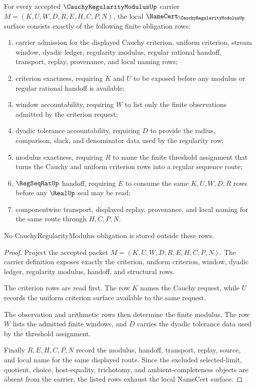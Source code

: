 \begin{theorem}
\label{thm:cauchy-regularity-modulus-namecert-obligations}
For every accepted $\CauchyRegularityModulusUp$ carrier $M=(K,U,W,D,R,E,H,C,P,N)$, the local $\NameCert_{\CauchyRegularityModulusUp}$ surface consists exactly of the following finite obligation rows:
\begin{enumerate}
\item carrier admission for the displayed Cauchy criterion, uniform criterion, stream window, dyadic ledger, regularity modulus, regular rational handoff, transport, replay, provenance, and local naming rows;
\item criterion exactness, requiring $K$ and $U$ to be exposed before any modulus or regular rational handoff is available;
\item window accountability, requiring $W$ to list only the finite observations admitted by the criterion request;
\item dyadic tolerance accountability, requiring $D$ to provide the radius, comparison, slack, and denominator data used by the regularity row;
\item modulus exactness, requiring $R$ to name the finite threshold assignment that turns the Cauchy and uniform criterion rows into a regular sequence route;
\item $\RegSeqRatUp$ handoff, requiring $E$ to consume the same $K,U,W,D,R$ rows before any $\RealUp$ seal may be read;
\item componentwise transport, displayed replay, provenance, and local naming for the same route through $H,C,P,N$.
\end{enumerate}
No CauchyRegularityModulus obligation is stored outside these rows.
\end{theorem}
\begin{proof}
Project the accepted packet $M=(K,U,W,D,R,E,H,C,P,N)$. The carrier definition exposes exactly the criterion, uniform criterion, window, dyadic ledger, regularity modulus, handoff, and structural rows.

The criterion rows are read first. The row $K$ names the Cauchy request, while $U$ records the uniform criterion surface available to the same request.

The observation and arithmetic rows then determine the finite modulus. The row $W$ lists the admitted finite windows, and $D$ carries the dyadic tolerance data used by the threshold assignment.

Finally $R,E,H,C,P,N$ record the modulus, handoff, transport, replay, source, and local name for the same displayed route. Since the excluded selected-limit, quotient, choice, host-equality, trichotomy, and ambient-completeness objects are absent from the carrier, the listed rows exhaust the local NameCert surface.
\end{proof}

